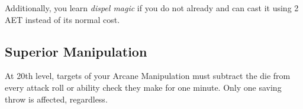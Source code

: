 Additionally, you learn \textit{dispel magic} if you do not already and can cast it using 2 AET instead of its normal cost.

\subsection{Superior Manipulation}

At 20th level, targets of your Arcane Manipulation must subtract the die from every attack roll or ability check they make for one minute. Only one saving throw is affected, regardless.

